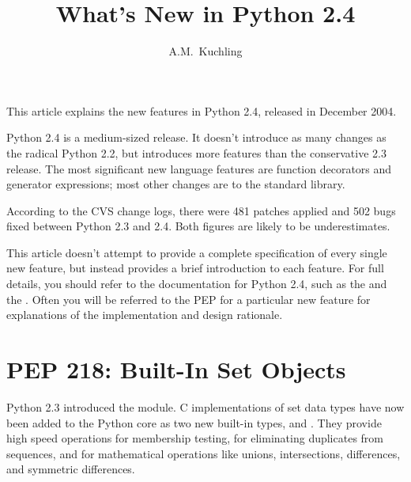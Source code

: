 \documentclass{howto}
\title{What's New in Python 2.4}
\author{A.M.\ Kuchling}
\begin{document}
\maketitle
\tableofcontents

This article explains the new features in Python 2.4, released in December
2004.

Python 2.4 is a medium-sized release.  It doesn't introduce as many
changes as the radical Python 2.2, but introduces more features than
the conservative 2.3 release.  The most significant new language
features are function decorators and generator expressions; most other
changes are to the standard library.

According to the CVS change logs, there were 481 patches applied and
502 bugs fixed between Python 2.3 and 2.4.  Both figures are likely to
be underestimates.

This article doesn't attempt to provide a complete specification of
every single new feature, but instead provides a brief introduction to
each feature.  For full details, you should refer to the documentation
for Python 2.4, such as the  and the .  Often you will be referred to the PEP for a particular new
feature for explanations of the implementation and design rationale.


\section{PEP 218: Built-In Set Objects}

Python 2.3 introduced the  module.  C implementations of
set data types have now been added to the Python core as two new
built-in types,  and
.  They provide high speed
operations for membership testing, for eliminating duplicates from
sequences, and for mathematical operations like unions, intersections,
differences, and symmetric differences.
\end{document}
